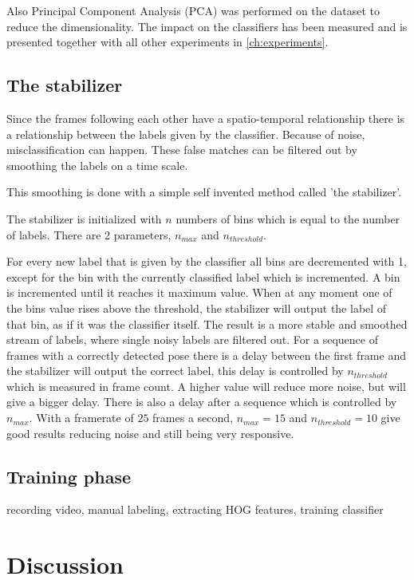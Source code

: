 Also Principal Component Analysis (PCA) was performed on the dataset to reduce the dimensionality. The impact on the classifiers has been measured and is presented together with all other experiments in \autoref{ch:experiments}.

\subsection*{The stabilizer}
Since the frames following each other have a spatio-temporal relationship there is a relationship between the labels given by the classifier. Because of noise, misclassification can happen. These false matches can be filtered out by smoothing the labels on a time scale.

This smoothing is done with a simple self invented method called 'the stabilizer'. 

The stabilizer is initialized with $n$ numbers of bins which is equal to the number of labels. There are 2 parameters, $n_{max}$ and $n_{threshold}$.

For every new label that is given by the classifier all bins are decremented with 1, except for the bin with the currently classified label which is incremented. A bin is incremented until it reaches it maximum value. When at any moment one of the bins value rises above the threshold, the stabilizer will output the label of that bin, as if it was the classifier itself. The result is a more stable and smoothed stream of labels, where single noisy labels are filtered out. For a sequence of frames with a correctly detected pose there is a delay between the first frame and the stabilizer will output the correct label, this delay is controlled by $n_{threshold}$ which is measured in frame count. A higher value will reduce more noise, but will give a bigger delay. There is also a delay after a sequence which is controlled by $n_{max}$. With a framerate of $25$ frames a second, $n_{max} = 15$ and $n_{threshold} = 10$ give good results reducing noise and still being very responsive. 

\subsection*{Training phase}
recording video, manual labeling, extracting HOG features, training classifier

\section{Discussion}
